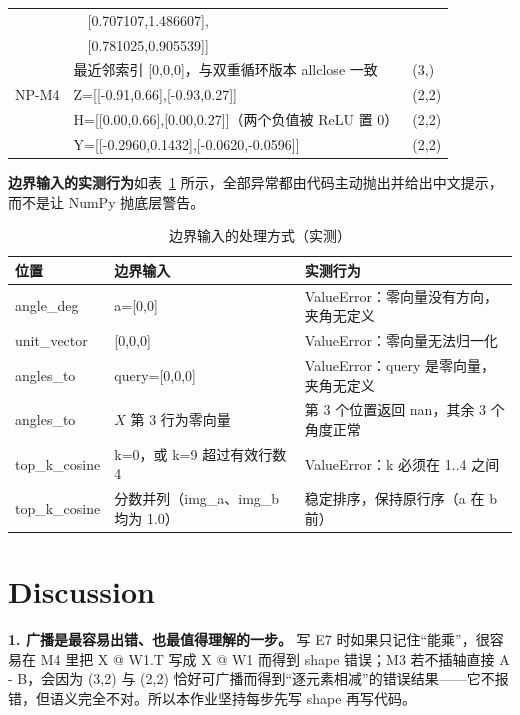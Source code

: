 \documentclass[a4paper,12pt]{article}
\newcommand{\code}[1]{{\ttfamily\footnotesize #1}}
\begin{document}
\begin{table}[H]
\begin{tabular}{@{}l p{10.2cm} p{2.0cm}@{}}
      & \code{~~[0.707107,1.486607],} & \\
      & \code{~~[0.781025,0.905539]]} & \\
      & 最近邻索引 \code{[0,0,0]}，与双重循环版本 \code{allclose} 一致 & \code{(3,)} \\
NP-M4 & \code{Z=[[-0.91,0.66],[-0.93,0.27]]} & \code{(2,2)} \\
      & \code{H=[[0.00,0.66],[0.00,0.27]]}（两个负值被 ReLU 置 0） & \code{(2,2)} \\
      & \code{Y=[[-0.2960,0.1432],[-0.0620,-0.0596]]} & \code{(2,2)} \\
\bottomrule
\end{tabular}
\end{table}

\textbf{边界输入的实测行为}如表~\ref{tab:edge} 所示，全部异常都由代码主动抛出并给出中文提示，而不是让 NumPy 抛底层警告。

\begin{table}[H]
\centering
\small
\setlength{\tabcolsep}{4pt}
\caption{边界输入的处理方式（实测）}
\label{tab:edge}
\begin{tabular}{@{}l l p{6.4cm}@{}}
\toprule
\textbf{位置} & \textbf{边界输入} & \textbf{实测行为} \\
\midrule
\code{angle\_deg} & \code{a=[0,0]} & \code{ValueError}：零向量没有方向，夹角无定义 \\
\code{unit\_vector} & \code{[0,0,0]} & \code{ValueError}：零向量无法归一化 \\
\code{angles\_to} & \code{query=[0,0,0]} & \code{ValueError}：query 是零向量，夹角无定义 \\
\code{angles\_to} & $X$ 第 3 行为零向量 & 第 3 个位置返回 \code{nan}，其余 3 个角度正常 \\
\code{top\_k\_cosine} & \code{k=0}，或 \code{k=9} 超过有效行数 4 & \code{ValueError}：k 必须在 1..4 之间 \\
\code{top\_k\_cosine} & 分数并列（\code{img\_a}、\code{img\_b} 均为 1.0） & 稳定排序，保持原行序（\code{a} 在 \code{b} 前） \\
\bottomrule
\end{tabular}
\end{table}

\section{Discussion}

\textbf{1. 广播是最容易出错、也最值得理解的一步。} 写 E7 时如果只记住“能乘”，很容易在 M4 里把 \code{X @ W1.T} 写成 \code{X @ W1} 而得到 shape 错误；M3 若不插轴直接 \code{A - B}，会因为 \code{(3,2)} 与 \code{(2,2)} 恰好可广播而得到“逐元素相减”的错误结果——它不报错，但语义完全不对。所以本作业坚持每步先写 shape 再写代码。
\end{document}
